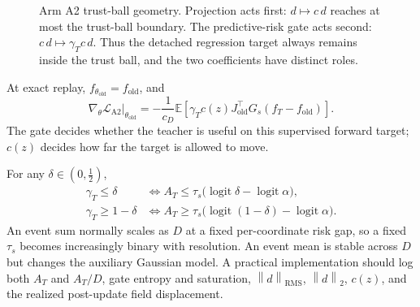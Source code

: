 \documentclass[11pt,a4paper]{article}
\newcommand{\E}{\mathbb{E}}
\newcommand{\norm}[1]{\left\lVert #1 \right\rVert}
\DeclareMathOperator{\logit}{logit}
\theoremstyle{plain}
\theoremstyle{definition}
\begin{document}
\begin{figure}[t]
\caption{Arm A2 trust-ball geometry.  Projection acts first:
$d\mapsto c\,d$ reaches at most the trust-ball boundary.  The predictive-risk gate acts second:
$c\,d\mapsto\gamma_Tc\,d$.  Thus the detached regression target always remains inside the
trust ball, and the two coefficients have distinct roles.}
\label{fig:a2-trust-ball}
\end{figure}

At exact replay, $f_{\theta_{\mathrm{old}}}=f_{\mathrm{old}}$, and
\begin{equation}
\left.
\nabla_\theta\mathcal L_{\mathrm{A2}}
\right|_{\theta_{\mathrm{old}}}
=
-\frac{1}{c_D}
\E\!\left[
  \gamma_Tc(z)
  J_{\mathrm{old}}^\top G_s
  (f_T-f_{\mathrm{old}})
\right].
\label{eq:a2-local-gradient}
\end{equation}
The gate decides whether the teacher is useful on this supervised forward target; $c(z)$ decides
how far the target is allowed to move.

For any $\delta\in(0,\tfrac12)$,
\begin{align}
\gamma_T\le\delta
&\iff
A_T\le
\tau_s\bigl(\logit\delta-\logit\alpha\bigr),\\
\gamma_T\ge1-\delta
&\iff
A_T\ge
\tau_s\bigl(\logit(1-\delta)-\logit\alpha\bigr).
\label{eq:a2-saturation}
\end{align}
An event sum normally scales as $D$ at a fixed per-coordinate risk gap, so a fixed $\tau_s$
becomes increasingly binary with resolution.  An event mean is stable across $D$ but changes the
auxiliary Gaussian model.  A practical implementation should log both $A_T$ and $A_T/D$, gate
entropy and saturation, $\norm{d}_{\mathrm{RMS}}$, $\norm{d}_{2}$, $c(z)$, and the realized
post-update field displacement.
\end{document}
